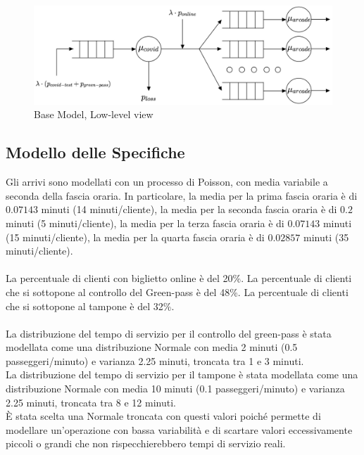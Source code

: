 \documentclass{article}
\begin{document}
\begin{figure}[H]
	\centering
	\captionsetup{justification=centering,margin=2cm}
	\includegraphics[scale=0.70]{images/base_model_low_level.jpg}
	\caption{Base Model, Low-level view}\label{figura:base_model_low_level}
\end{figure}


\subsection{Modello delle Specifiche}
Gli arrivi sono modellati con un processo di Poisson, con media variabile a seconda della fascia oraria. In particolare, la media per la prima fascia oraria è di $0.07143$  minuti (14 minuti/cliente), la media per la seconda fascia oraria è di $0.2$  minuti (5 minuti/cliente), la media per la terza fascia oraria è di $0.07143$   minuti (15 minuti/cliente), la media per la quarta fascia oraria è di $0.02857$  minuti (35 minuti/cliente).
\\ \\
La percentuale di clienti con biglietto online è del 20\%. La percentuale di clienti che si sottopone al controllo del  Green-pass è del 48\%. La percentuale di clienti che si sottopone al tampone è del 32\%.
\\ \\
La distribuzione del tempo di servizio per il controllo del green-pass è stata modellata
come una distribuzione Normale con media 2 minuti (0.5 passeggeri/minuto) e varianza 2.25 minuti, troncata tra 1 e 3 minuti. 
\\
La distribuzione del tempo di servizio per il tampone è stata modellata
come una distribuzione Normale con media 10 minuti (0.1 passeggeri/minuto) e varianza 2.25 minuti, troncata tra 8 e 12 minuti. 
\\
È stata scelta una Normale troncata con questi valori poiché permette di modellare un'operazione con bassa variabilità e di scartare valori eccessivamente piccoli o grandi che non rispecchierebbero tempi di servizio reali.
\end{document}
